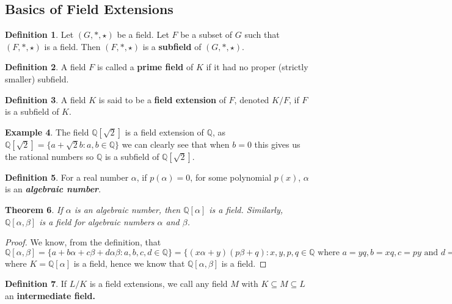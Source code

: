\documentclass[12pt]{article}
\newtheorem{theorem}{Theorem}
\theoremstyle{definition}
\newtheorem{definition}[theorem]{Definition}
\newtheorem{example}[theorem]{Example}
\begin{document}
\subsection{Basics of Field Extensions}
\begin{definition}
Let \((G, *,\star )\) be a field. Let \(F\) be a subset of \(G\) such that \((F,*,\star)\) is a field. Then \((F, *,\star)\) is a \textbf{subfield}
 of \((G, *, \star)\).
\end{definition}
\begin{definition}
A field \(F\) is called a \textbf{prime field} of \(K\) if it had no proper (strictly smaller) subfield.
\end{definition}
\begin{definition}
A field \(K\) is said to be a \textbf{field extension} of \(F\), denoted \(K / F\), if \(F\) is a subfield of \(K\). \cite{Moy}
\end{definition}
\begin{example}
The field \(\mathbb{Q}[\sqrt{2}]\) is a field extension of \(\mathbb{Q}\), as \(\mathbb{Q}[\sqrt{2}] = \{a + \sqrt{2}b : a,b \in \mathbb{Q}\}\) we can clearly see that when \(b = 0\) this gives us the rational numbers so \(\mathbb{Q}\) is a subfield of \(\mathbb{Q}[\sqrt{2}]\).
\end{example}
\begin{definition}
For a real number \(\alpha\), if \(p(\alpha)=0\), for some polynomial \(p(x)\), \(\alpha\) is an \textbf{\textit{algebraic number}}.
\end{definition}
\begin{theorem}
If \(\alpha\) is an algebraic number, then \(\mathbb{Q}[\alpha]\) is a field. Similarly, \(\mathbb{Q}[\alpha,\beta]\) is a field for algebraic numbers \(\alpha\) and \(\beta\).
\end{theorem}
\begin{proof}
We know, from the definition, that \(\mathbb{Q}[\alpha,\beta] = \{a + b\alpha + c\beta + d\alpha\beta : a,b,c,d \in \mathbb{Q}\} = \{(x\alpha + y)(p\beta + q) : x,y,p,q \in \mathbb{Q} \text{ where } a = yq, b = xq, c = py \text{ and } d = xp \} = \mathbb{Q}[\alpha,\beta] = K[\beta]\) where \(K = \mathbb{Q}[\alpha]\) is a field, hence we know that \(\mathbb{Q}[\alpha,\beta]\) is a field.  
\end{proof}


\begin{definition}
    If $L/K$ is a field extensions, we call any field $M$ with $K \subseteq M \subseteq L$ an \textbf{intermediate field.}
\end{definition}
\end{document}
